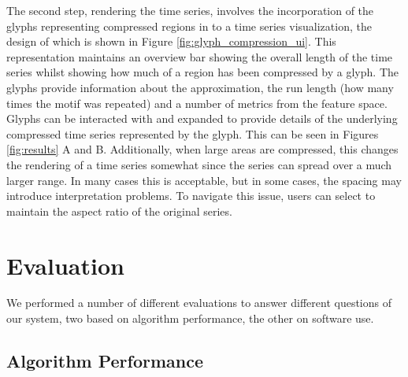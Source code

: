 The second step, rendering the time series, involves the incorporation of the glyphs representing compressed regions in to a time series visualization, the design of which is shown in Figure \ref{fig:glyph_compression_ui}. 
This representation maintains an overview bar showing the overall length of the time series whilst showing how much of a region has been compressed by a glyph. 
The glyphs provide information about the approximation, the run length (how many times the motif was repeated) and a number of metrics from the feature space. 
Glyphs can be interacted with and expanded to provide details of the underlying compressed time series represented by the glyph. 
This can be seen in Figures \ref{fig:results} A and B. 
Additionally, when large areas are compressed, this changes the rendering of a time series somewhat since the series can spread over a much larger range. 
In many cases this is acceptable, but in some cases, the spacing may introduce interpretation problems. 
To navigate this issue, users can select to maintain the aspect ratio of the original series.


\section{Evaluation}

We performed a number of different evaluations to answer different questions of our system, two based on algorithm performance, the other on software use. 

\subsection{Algorithm Performance}

